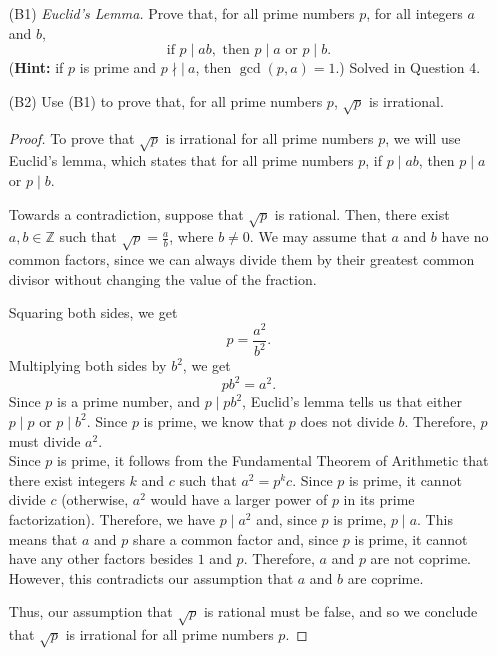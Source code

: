 \documentclass{article}
\begin{document}
    \begin{itemize}

    	\item [(B1)] \emph{Euclid's Lemma.} Prove that, for all prime numbers $p$, for all integers $a$ and $b$,
    		\[
    			\text{if } p \mid ab, \text{ then } p \mid a \text{ or } p \mid b.
    		\]
    		(\textbf{Hint:} if $p$ is prime and $p\nmid|\ a$, then $\gcd(p,a) = 1$.)
                \ppar Solved in Question 4.

    	\item [(B2)] Use (B1) to prove that, for all prime numbers $p$, $\sqrt{p}$ is irrational.
                \begin{proof}
                    To prove that $\sqrt{p}$ is irrational for all prime numbers $p$, we will use Euclid's lemma, which states that for all prime numbers $p$, if $p \mid ab$, then $p \mid a$ or $p \mid b$.

                    Towards a contradiction, suppose that $\sqrt{p}$ is rational. Then, there exist $a, b\in\mathbb{Z}$ such that $\sqrt{p}=\frac{a}{b}$, where $b\neq0$. We may assume that $a$ and $b$ have no common factors, since we can always divide them by their greatest common divisor without changing the value of the fraction.

                    Squaring both sides, we get 
                    \[
                        p = \frac{a^2}{b^2}.
                    \]
                    Multiplying both sides by $b^2$, we get
                    \[
                        pb^2 = a^2.
                    \]
                    Since $p$ is a prime number, and $p \mid pb^2$, Euclid's lemma tells us that either $p \mid p$ or $p \mid b^2$. Since $p$ is prime, we know that $p$ does not divide $b$. Therefore, $p$ must divide $a^2$.\\

                    Since $p$ is prime, it follows from the Fundamental Theorem of Arithmetic that there exist integers $k$ and $c$ such that $a^2 = p^kc$. Since $p$ is prime, it cannot divide $c$ (otherwise, $a^2$ would have a larger power of $p$ in its prime factorization). Therefore, we have $p \mid a^2$ and, since $p$ is prime, $p \mid a$. This means that $a$ and $p$ share a common factor and, since $p$ is prime, it cannot have any other factors besides $1$ and $p$. Therefore, $a$ and $p$ are not coprime. However, this contradicts our assumption that $a$ and $b$ are coprime.

                    Thus, our assumption that $\sqrt{p}$ is rational must be false, and so we conclude that $\sqrt{p}$ is irrational for all prime numbers $p$.
                \end{proof}
    \end{itemize}
    
\end{document}

